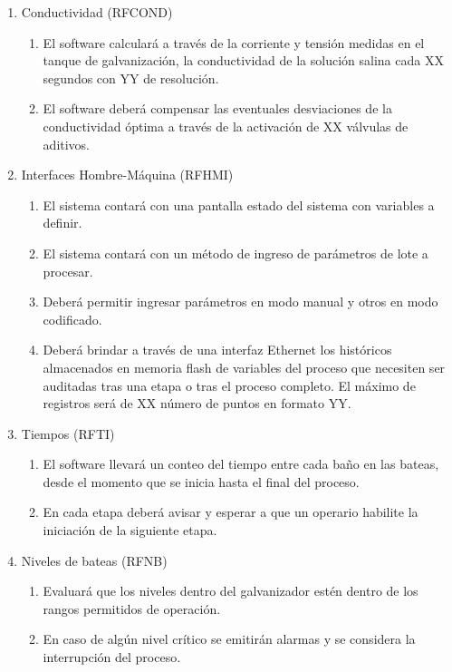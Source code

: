 \begin{enumerate}
\begin{enumerate}
\item Conductividad (RFCOND)
\begin{enumerate}
\item El software calculará a través de la corriente y tensión medidas en el tanque de galvanización, la conductividad de la solución salina cada XX segundos con YY de resolución.
\item El software deberá compensar las eventuales desviaciones de la conductividad óptima a través de la activación de XX válvulas de aditivos.
\end{enumerate}

\item Interfaces Hombre-Máquina (RFHMI)
\begin{enumerate}
\item El sistema contará con una pantalla estado del sistema con variables a definir.
\item El sistema contará con un método de ingreso de parámetros de lote a procesar.
\item Deberá permitir ingresar parámetros en modo manual y otros en modo codificado.
\item Deberá brindar a través de una interfaz Ethernet los históricos almacenados en memoria flash de variables del proceso que necesiten ser auditadas tras una etapa o tras el proceso completo. El máximo de registros será de XX número de puntos en formato YY.
\end{enumerate}

\item Tiempos (RFTI)
\begin{enumerate}
\item El software llevará un conteo del tiempo entre cada baño en las bateas, desde el momento que se inicia hasta el final del proceso.
\item En cada etapa deberá avisar y esperar a que un operario habilite la iniciación de la siguiente etapa.
\end{enumerate}

\item Niveles de bateas (RFNB)	
\begin{enumerate}
\item Evaluará que los niveles dentro del galvanizador estén dentro de los rangos permitidos de operación.
\item En caso de algún nivel crítico se emitirán alarmas y se considera la interrupción del proceso.
\end{enumerate}

\end{enumerate}


\end{enumerate}
